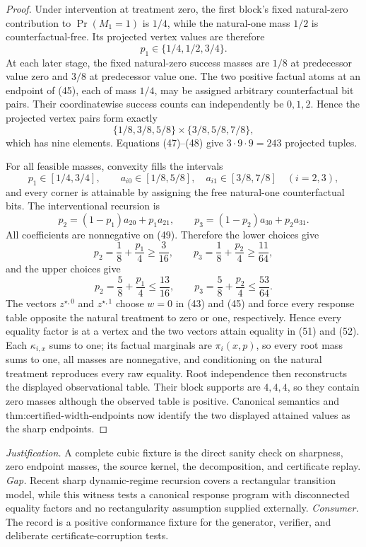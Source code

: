 \documentclass{article}
\begin{document}
\begin{proof}
Under intervention at treatment zero, the first block's fixed natural-zero contribution to \(\Pr(M_1=1)\) is \(1/4\), while the natural-one mass \(1/2\) is counterfactual-free.  Its projected vertex values are therefore
\[
p_1\in\{1/4,1/2,3/4\}. \tag{47}
\]
At each later stage, the fixed natural-zero success masses are \(1/8\) at predecessor value zero and \(3/8\) at predecessor value one.  The two positive factual atoms at an endpoint of (45), each of mass \(1/4\), may be assigned arbitrary counterfactual bit pairs.  Their coordinatewise success counts can independently be \(0,1,2\).  Hence the projected vertex pairs form exactly
\[
\{1/8,3/8,5/8\}\times\{3/8,5/8,7/8\}, \tag{48}
\]
which has nine elements.  Equations (47)--(48) give \(3\cdot9\cdot9=243\) projected tuples.

For all feasible masses, convexity fills the intervals
\[
p_1\in[1/4,3/4],\qquad
a_{i0}\in[1/8,5/8],\quad
a_{i1}\in[3/8,7/8]\quad(i=2,3), \tag{49}
\]
and every corner is attainable by assigning the free natural-one counterfactual bits.  The interventional recursion is
\[
p_2=(1-p_1)a_{20}+p_1a_{21},\qquad
p_3=(1-p_2)a_{30}+p_2a_{31}. \tag{50}
\]
All coefficients are nonnegative on (49).  Therefore the lower choices give
\[
p_2=\frac18+\frac{p_1}{4}\ge\frac{3}{16},
\qquad
p_3=\frac18+\frac{p_2}{4}\ge\frac{11}{64}, \tag{51}
\]
and the upper choices give
\[
p_2=\frac58+\frac{p_1}{4}\le\frac{13}{16},
\qquad
p_3=\frac58+\frac{p_2}{4}\le\frac{53}{64}. \tag{52}
\]
The vectors \(z^{\star,0}\) and \(z^{\star,1}\) choose \(w=0\) in (43) and (45) and force every response table opposite the natural treatment to zero or one, respectively.  Hence every equality factor is at a vertex and the two vectors attain equality in (51) and (52).  Each \(\kappa_{i,x}\) sums to one; its factual marginals are \(\pi_i(x,p)\), so every root mass sums to one, all masses are nonnegative, and conditioning on the natural treatment reproduces every raw equality.  Root independence then reconstructs the displayed observational table.  Their block supports are \(4,4,4\), so they contain zero masses although the observed table is positive.  Canonical semantics and \(\text{thm:certified-width-endpoints}\) now identify the two displayed attained values as the sharp endpoints.
\end{proof}
\par\smallskip\noindent \textit{Justification.} A complete cubic fixture is the direct sanity check on sharpness, zero endpoint masses, the source kernel, the decomposition, and certificate replay. \textit{Gap.} Recent sharp dynamic-regime recursion covers a rectangular transition model, while this witness tests a canonical response program with disconnected equality factors and no rectangularity assumption supplied externally. \textit{Consumer.} The record is a positive conformance fixture for the generator, verifier, and deliberate certificate-corruption tests.
\end{document}
